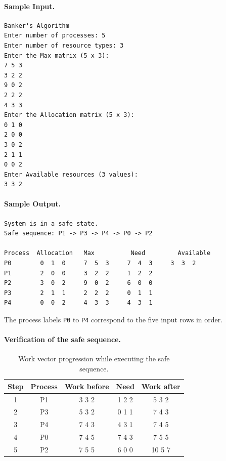 

\paragraph{Sample Input.}
\begin{lstlisting}[style=terminal]
Banker's Algorithm
Enter number of processes: 5
Enter number of resource types: 3
Enter the Max matrix (5 x 3):
7 5 3
3 2 2
9 0 2
2 2 2
4 3 3
Enter the Allocation matrix (5 x 3):
0 1 0
2 0 0
3 0 2
2 1 1
0 0 2
Enter Available resources (3 values):
3 3 2
\end{lstlisting}

\paragraph{Sample Output.}
\begin{lstlisting}[style=terminal]
System is in a safe state.
Safe sequence: P1 -> P3 -> P4 -> P0 -> P2

Process  Allocation   Max          Need         Available
P0        0  1  0     7  5  3     7  4  3     3  3  2
P1        2  0  0     3  2  2     1  2  2
P2        3  0  2     9  0  2     6  0  0
P3        2  1  1     2  2  2     0  1  1
P4        0  0  2     4  3  3     4  3  1
\end{lstlisting}
The process labels \texttt{P0} to \texttt{P4} correspond to the five input rows in order.

\paragraph{Verification of the safe sequence.}
\begin{table}[H]
\centering
\renewcommand{\arraystretch}{1.2}
\small
\begin{tabular}{|c|c|c|c|c|}
\hline
\textbf{Step} & \textbf{Process} & \textbf{Work before} & \textbf{Need} & \textbf{Work after} \\ \hline
1 & P1 & 3 3 2 & 1 2 2 & 5 3 2 \\ \hline
2 & P3 & 5 3 2 & 0 1 1 & 7 4 3 \\ \hline
3 & P4 & 7 4 3 & 4 3 1 & 7 4 5 \\ \hline
4 & P0 & 7 4 5 & 7 4 3 & 7 5 5 \\ \hline
5 & P2 & 7 5 5 & 6 0 0 & 10 5 7 \\ \hline
\end{tabular}
\caption{Work vector progression while executing the safe sequence.}
\end{table}


